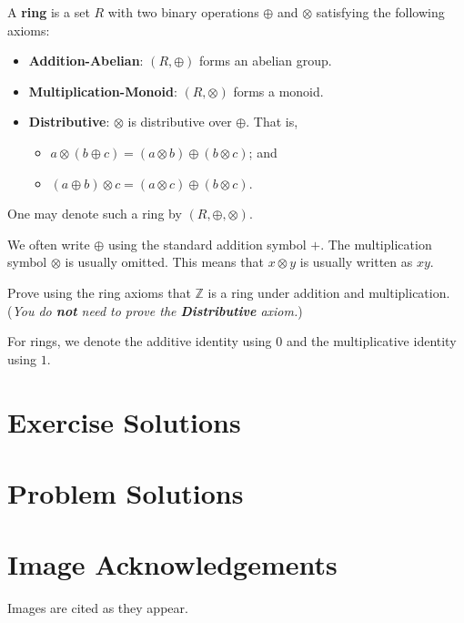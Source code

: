 \begin{definition}
    A \textbf{ring} is a set $R$ with two binary operations $\oplus$ and $\otimes$ satisfying the following axioms:
    \begin{itemize}
        \item \textbf{Addition-Abelian}: $(R, \oplus)$ forms an abelian group.
        \item \textbf{Multiplication-Monoid}: $(R, \otimes)$ forms a monoid.
        \item \textbf{Distributive}: $\otimes$ is distributive over $\oplus$. That is,
        \begin{itemize}
            \item $a \otimes (b \oplus c) = (a \otimes b) \oplus (b \otimes c)$; and
            \item $(a \oplus b) \otimes c = (a \otimes c) \oplus (b \otimes c)$.
        \end{itemize}
    \end{itemize}
    One may denote such a ring by $(R, \oplus, \otimes)$.
\end{definition}
\begin{remark}
    We often write $\oplus$ using the standard addition symbol $+$. The multiplication symbol $\otimes$ is usually omitted. This means that $x \otimes y$ is usually written as $xy$.
\end{remark}


\begin{exercise}
    Prove using the ring axioms that $\mathbb{Z}$ is a ring under addition and multiplication.\newline
    (\textit{You do \textbf{not} need to prove the \textbf{Distributive} axiom.})
\end{exercise}

For rings, we denote the additive identity using $0$ and the multiplicative identity using $1$.

\appendix
\chapter{Exercise Solutions}

\chapter{Problem Solutions}

\chapter{Image Acknowledgements}
Images are cited as they appear.

\printbibliography[heading=bibintoc, title={References and Bibliography}]


